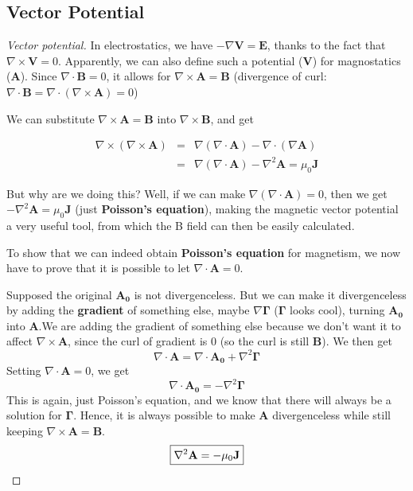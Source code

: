 \subsection{Vector Potential}
\begin{proof}[Vector potential]
    In electrostatics, we have $-\nabla \mathbf{V}=\mathbf{E}$, thanks to the fact that $\nabla \times \mathbf{V}=0$.
    Apparently, we can also define such a potential ($\mathbf{V}$) for magnostatics ($\mathbf{A}$).
    Since $\nabla \cdot \mathbf{B}=0$, it allows for $\nabla \times \mathbf{A}=\mathbf{B}$ (divergence of curl: $\nabla \cdot \mathbf{B}=\nabla \cdot (\nabla \times \mathbf{A})=0$)

    We can substitute $\nabla \times \mathbf{A}=\mathbf{B}$ into $\nabla \times \mathbf{B}$, and get

    \begin{eqnarray}
        \nabla \times (\nabla \times \mathbf{A})&=&\nabla(\nabla \cdot \mathbf{A})-\nabla \cdot (\nabla \mathbf{A})\\
        &=&\nabla(\nabla \cdot \mathbf{A})-\nabla^2 \mathbf{A}=\mu_0 \mathbf{J}
    \end{eqnarray}

    But why are we doing this? Well, if we can make $\nabla(\nabla \cdot \mathbf{A})=0$, then we get $-\nabla^2 \mathbf{A}=\mu_0 \mathbf{J}$ (just \textbf{Poisson's equation}), making the magnetic vector potential a very useful tool, from which the B field can then be easily calculated.

    To show that we can indeed obtain \textbf{Poisson's equation} for magnetism, we now have to prove that it is possible to let $\nabla \cdot \mathbf{A}=0$.

    Supposed the original $\mathbf{A_0}$ is not divergenceless. But we can make it divergenceless by adding the \textbf{gradient} of something else, maybe $\nabla \mathbf{\Gamma}$ ($\mathbf{\Gamma}$ looks cool), turning $\mathbf{A_0}$ into $\mathbf{A}$.We are adding the gradient of something else because we don't want it to affect $\nabla \times \mathbf{A}$, since the curl of gradient is 0 (so the curl is still $\mathbf{B}$). We then get
    \begin{equation}
        \nabla \cdot \mathbf{A}=\nabla \cdot \mathbf{A_0}+\nabla ^2 \mathbf{\Gamma}
    \end{equation}
    Setting $\nabla \cdot \mathbf{A}=0$, we get
    \begin{equation}
        \nabla \cdot \mathbf{A_0}=-\nabla ^2 \mathbf{\Gamma}
    \end{equation}
    This is again, just Poisson's equation, and we know that there will always be a solution for $\mathbf{\Gamma}$. Hence, it is always possible to make $\mathbf{A}$ divergenceless while still keeping $\nabla \times \mathbf{A}=\mathbf{B}$.
    \begin{equation}
        \boxed{\nabla^2 \mathbf{A}=-\mu_0 \mathbf{J}}\qedhere
    \end{equation}
\end{proof}

